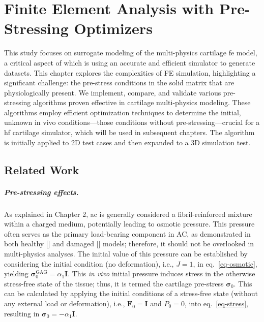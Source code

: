 \documentclass[12pt,a4paper]{report}
\begin{document}
\chapter{Finite Element Analysis with Pre-Stressing Optimizers}

This study focuses on surrogate modeling of the multi-physics cartilage \ac{fe} model, a critical aspect of which is using an accurate and efficient simulator to generate datasets. This chapter explores the complexities of FE simulation, highlighting a significant challenge: the pre-stress conditions in the solid matrix that are physiologically present. We implement, compare, and validate various pre-stressing algorithms proven effective in cartilage multi-physics modeling. These algorithms employ efficient optimization techniques to determine the initial, unknown in vivo conditions—those conditions without pre-stressing—crucial for a \ac{hf} cartilage simulator, which will be used in subsequent chapters. The algorithm is initially applied to 2D test cases and then expanded to a 3D simulation test.

\section{Related Work}

\paragraph{Pre-stressing effects.} As explained in Chapter 2, \ac{ac} is generally considered a fibril-reinforced mixture within a charged medium, potentially leading to osmotic pressure. This pressure often serves as the primary load-bearing component in AC, as demonstrated in both healthy [\cite{quiroga2017}] and damaged [\cite{sajjadinia2019}] models; therefore, it should not be overlooked in multi-physics analyses. The initial value of this pressure can be established by considering the initial condition (no deformation), i.e., $J = 1$, in eq.~\ref{eq-osmotic}, yielding $\boldsymbol{\sigma}^{\text{GAG}}_0 = \alpha_1 \mathbf{I}$. This \textit{in vivo} initial pressure induces stress in the otherwise stress-free state of the tissue; thus, it is termed the cartilage pre-stress $\boldsymbol{\sigma}_0$. This can be calculated by applying the initial conditions of a stress-free state (without any external load or deformation), i.e., $\textbf{F}_0=\textbf{I}$ and $P_0 = 0$, into eq.~\ref{eq-stress}, resulting in $\boldsymbol{\sigma}_0 = -\alpha_1 \mathbf{I}$.
\end{document}
